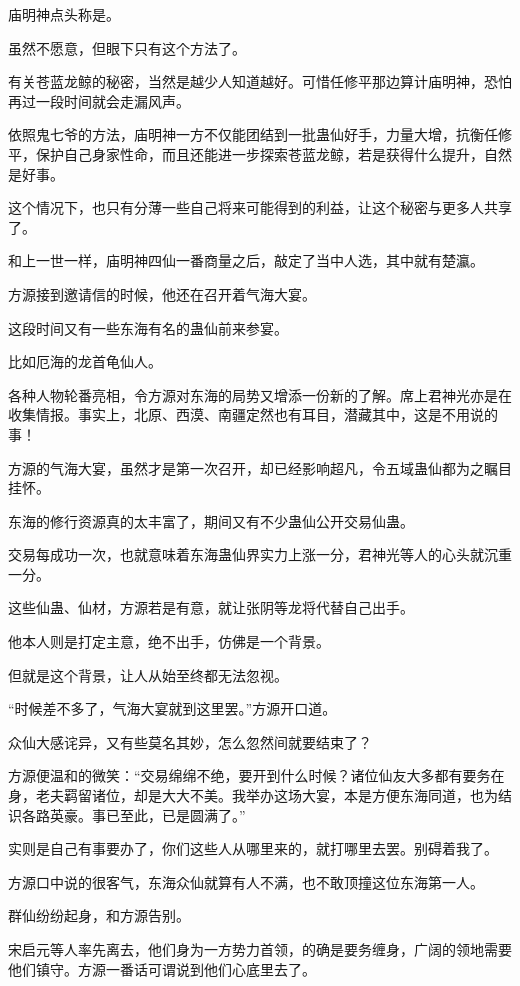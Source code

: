\begin{this_body}
庙明神点头称是。

虽然不愿意，但眼下只有这个方法了。

有关苍蓝龙鲸的秘密，当然是越少人知道越好。可惜任修平那边算计庙明神，恐怕再过一段时间就会走漏风声。

依照鬼七爷的方法，庙明神一方不仅能团结到一批蛊仙好手，力量大增，抗衡任修平，保护自己身家性命，而且还能进一步探索苍蓝龙鲸，若是获得什么提升，自然是好事。

这个情况下，也只有分薄一些自己将来可能得到的利益，让这个秘密与更多人共享了。

和上一世一样，庙明神四仙一番商量之后，敲定了当中人选，其中就有楚瀛。

方源接到邀请信的时候，他还在召开着气海大宴。

这段时间又有一些东海有名的蛊仙前来参宴。

比如厄海的龙首龟仙人。

各种人物轮番亮相，令方源对东海的局势又增添一份新的了解。席上君神光亦是在收集情报。事实上，北原、西漠、南疆定然也有耳目，潜藏其中，这是不用说的事！

方源的气海大宴，虽然才是第一次召开，却已经影响超凡，令五域蛊仙都为之瞩目挂怀。

东海的修行资源真的太丰富了，期间又有不少蛊仙公开交易仙蛊。

交易每成功一次，也就意味着东海蛊仙界实力上涨一分，君神光等人的心头就沉重一分。

这些仙蛊、仙材，方源若是有意，就让张阴等龙将代替自己出手。

他本人则是打定主意，绝不出手，仿佛是一个背景。

但就是这个背景，让人从始至终都无法忽视。

“时候差不多了，气海大宴就到这里罢。”方源开口道。

众仙大感诧异，又有些莫名其妙，怎么忽然间就要结束了？

方源便温和的微笑：“交易绵绵不绝，要开到什么时候？诸位仙友大多都有要务在身，老夫羁留诸位，却是大大不美。我举办这场大宴，本是方便东海同道，也为结识各路英豪。事已至此，已是圆满了。”

实则是自己有事要办了，你们这些人从哪里来的，就打哪里去罢。别碍着我了。

方源口中说的很客气，东海众仙就算有人不满，也不敢顶撞这位东海第一人。

群仙纷纷起身，和方源告别。

宋启元等人率先离去，他们身为一方势力首领，的确是要务缠身，广阔的领地需要他们镇守。方源一番话可谓说到他们心底里去了。

\end{this_body}

